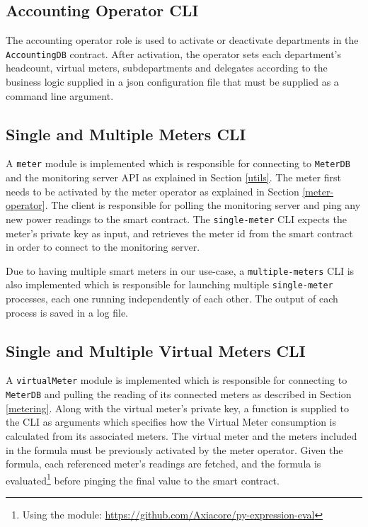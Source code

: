 \subsection{Accounting Operator CLI}
The accounting operator role is used to activate or deactivate departments in the \texttt{AccountingDB} contract. After activation, the operator sets each department's headcount, virtual meters, subdepartments and delegates according to the business logic supplied in a json configuration file that must be supplied as a command line argument.

\subsection{Single and Multiple Meters CLI}

A \texttt{meter} module is implemented which is responsible for connecting to \texttt{MeterDB} and the monitoring server API as explained in Section \ref{utils}. The meter first needs to be activated by the meter operator as explained in Section \ref{meter-operator}. The client is responsible for polling the monitoring server and ping any new power readings to the smart contract. The \texttt{single-meter} CLI expects the meter's private key as input, and retrieves the meter id from the smart contract in order to connect to the monitoring server.

Due to having multiple smart meters in our use-case, a \texttt{multiple-meters} CLI is also implemented which is responsible for launching multiple \texttt{single-meter} processes, each one running independently of each other. The output of each process is saved in a log file.

\subsection{Single and Multiple Virtual Meters CLI}

A \texttt{virtualMeter} module is implemented which is responsible for connecting to \texttt{MeterDB} and pulling the reading of its connected meters as described in Section \ref{metering}. Along with the virtual meter's private key, a function is supplied to the CLI as arguments which specifies how the Virtual Meter consumption is calculated from its associated meters. The virtual meter and the meters included in the formula must be previously activated by the meter operator. Given the formula, each referenced meter's readings are fetched, and the formula is evaluated\footnote{Using the module: \url{https://github.com/Axiacore/py-expression-eval}} before pinging the final value to the smart contract.

